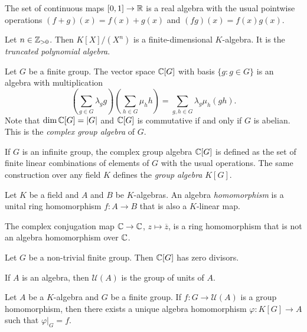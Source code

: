 \begin{example}
	The set of continuous maps $[0,1]\to\mathbb{R}$ is a real algebra with the usual
	pointwise operations $(f+g)(x)=f(x)+g(x)$ and $(fg)(x)=f(x)g(x)$. 
\end{example}

\begin{example}
	Let $n\in\mathbb{Z}_{>0}$. Then $K[X]/(X^n)$ is a finite-dimensional $K$-algebra. 
    It is the \emph{truncated polynomial algebra}.  
\end{example}

\begin{example}
	Let $G$ be a finite group. The vector space 
	$\mathbb{C}[G]$ with basis $\{g:g\in G\}$
	is an algebra with multiplication
	\[
	\left(\sum_{g\in G}\lambda_gg\right)\left(\sum_{h\in G}\mu_hh\right)
	=\sum_{g,h\in G}\lambda_g\mu_h(gh).
	\] 	
	Note that $\dim\mathbb{C}[G]=|G|$ and
	$\mathbb{C}[G]$ is commutative if and only if $G$ is abelian. 
	This is the \emph{complex group algebra} of $G$. 
\end{example}

If $G$ is an infinite group, the complex group algebra $\mathbb{C}[G]$ 
is defined as the set 
of finite linear combinations of elements of $G$ 
with the usual operations. The same construction over any field $K$ defines the
\emph{group algebra} $K[G]$.

\begin{definition}
    Let $K$ be a field and $A$ and $B$ be $K$-algebras.  An algebra
    \emph{homomorphism} is a unital ring homomorphism $f\colon A\to B$ that is
    also a $K$-linear map. 
\end{definition}

The complex conjugation map  $\mathbb{C}\to \mathbb{C}$, $z\mapsto\overline{z}$, is a ring
homomorphism that is not an algebra homomorphism over $\mathbb{C}$. 
 
\begin{exercise}
\label{xca:G_zero_divisors}
	Let $G$ be a non-trivial finite group. 
	Then $\mathbb{C}[G]$ has zero divisors. 
\end{exercise}

If $A$ is an algebra, then $\mathcal{U}(A)$ is the group  
of units of $A$. 

\begin{exercise}
\label{xca:units_UP}
	Let $A$ be a $K$-algebra and $G$ be a finite group. 
	If $f\colon G\to\mathcal{U}(A)$ is a group homomorphism, 
	then there exists a unique algebra homomorphism 
	$\varphi\colon K[G]\to A$ such that $\varphi|_G=f$.   	
\end{exercise}


